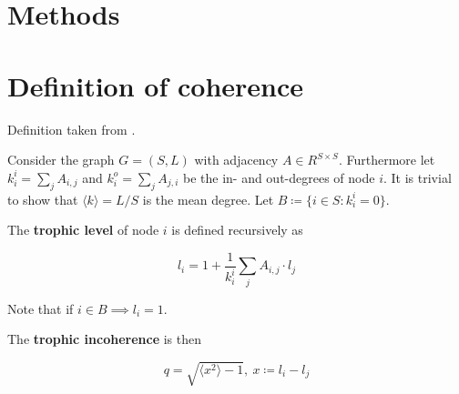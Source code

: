 \documentclass{article}
\title{
    \vspace{2in}
    \textmd{\hmwkTitle}\\
    \vspace{3in}
}
\author{\hmwkAuthorName}
\newcommand{\mean}[1]{\langle{#1}\rangle}
\newcommand{\citeout}[1]{\citeauthor{#1} \citeyear{#1}}
\begin{document}
\maketitle
\thispagestyle{empty}

\newpage

\setcounter{page}{1}

\section{Methods}



\section{Definition of coherence}

Definition taken from \citeout{DomnguezGarca2016}. 

Consider the graph $G = (S, L)$ with adjacency $A \in R^{S \times S}$. Furthermore let $k_i^i = \sum_{j} A_{i, j}$ and $k_i^o = \sum_{j} A_{j, i}$ be the in- and out-degrees of node $i$. It is trivial to show that $\mean{k} = L/S$ is the mean degree. Let $B \coloneqq \{ i \in S: k_i^i = 0 \}$.

The \textbf{trophic level} of node $i$ is defined recursively as 

\begin{equation}
    l_i = 1 + \frac{1}{k_i^i} \sum_j A_{i,j} \cdot l_j
\end{equation}

Note that if $i \in B \implies l_i = 1$.

The \textbf{trophic incoherence} is then

\begin{equation}
    q = \sqrt{\mean{x^2} - 1}, \ x\coloneqq l_i - l_j
\end{equation}

\newpage
\nocite{*}

 
\end{document}
